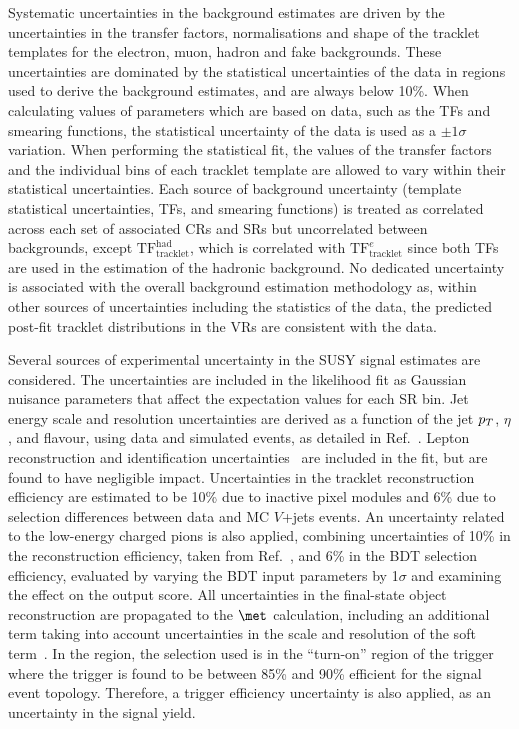 Systematic uncertainties in the background estimates are driven by the uncertainties in the transfer factors, normalisations and shape of the tracklet \pt templates for the electron, muon, hadron and fake backgrounds. These uncertainties are dominated by the statistical uncertainties of the data in regions used to derive the background estimates, and are always below 10\%. When calculating values of parameters which are based on data, such as the TFs and smearing functions, the statistical uncertainty of the data is used as a $\pm 1\sigma$ variation. When performing the statistical fit, the values of the transfer factors and the individual bins of each tracklet \pt template are allowed to vary within their statistical uncertainties. Each source of background uncertainty (\pt template statistical uncertainties, TFs, and smearing functions) is treated as correlated across each set of associated CRs and SRs but uncorrelated between backgrounds, except $\mathrm{TF}^\mathrm{had}_{\mathrm{tracklet}}$, which is correlated with $\mathrm{TF}^e_{\mathrm{tracklet}}$ since both TFs are used in the estimation of the hadronic background. No dedicated uncertainty is associated with the overall background estimation methodology as, within other sources of uncertainties including the statistics of the data, the predicted post-fit tracklet \pt distributions in the VRs are consistent with the data.

Several sources of experimental uncertainty in the SUSY signal estimates are considered. The uncertainties are included in the likelihood fit as Gaussian nuisance parameters that affect the expectation values for each SR bin. Jet energy scale and resolution uncertainties are derived as a function of the jet $p_T$, $\eta$, and flavour, using data and simulated events, as detailed in Ref.~\cite{JETM-2018-05}.
Lepton reconstruction and identification uncertainties~\cite{EGAM-2021-01,MUON-2018-03} are included in the fit, but are found to have negligible impact.
Uncertainties in the tracklet reconstruction efficiency are estimated to be 10\% due to inactive pixel modules and 6\% due to selection differences between data and MC $V$+\;\!jets events. An uncertainty related to the low-energy charged pions is also applied, combining uncertainties of 10\% in the reconstruction efficiency, taken from Ref.~\cite{IDTR-2021-03}, and 6\% in the BDT selection efficiency, evaluated by varying the BDT input parameters by 1$\sigma$ and examining the effect on the output score. All uncertainties in the final-state object reconstruction are propagated to the $\met$ calculation, including an additional term taking into account uncertainties in the scale and resolution of the soft term~\cite{JETM-2020-03}. In the \SRAm region, the \met selection used is in the \enquote{turn-on} region of the \met trigger where the trigger is found to be between 85\% and 90\% efficient for the signal event topology. Therefore, a trigger efficiency uncertainty is also applied, as an uncertainty in the signal yield. 

